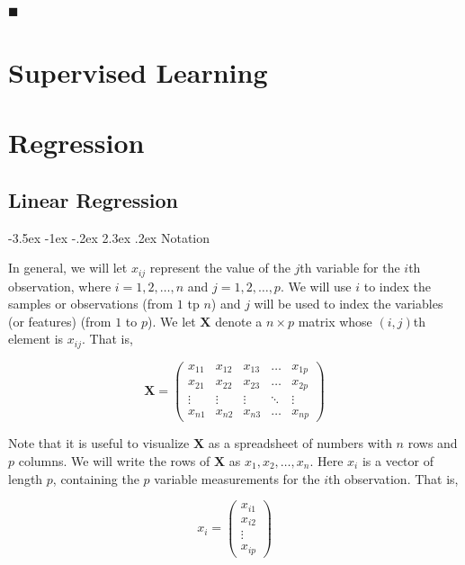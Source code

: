 \documentclass[]{book}
\makeatletter
\renewcommand\section{\@startsection {section}{1}{\z@}%
                                   {-3.5ex \@plus -1ex \@minus -.2ex}%
                                   {2.3ex \@plus.2ex}%
                                   {\normalfont\Large\bfseries\color{ForestGreen}}}
\theoremstyle{definition}
\theoremstyle{definition}
\theoremstyle{definition}
\theoremstyle{remark}
\makeatother
\begin{document}
◼

\part{Supervised Learning}\label{part-supervised-learning}

\part*{Regression}\label{part-regression}

\chapter{Linear Regression}\label{linear-regression}

\section{Notation}\label{notation}

In general, we will let \(x_{ij}\) represent the value of the \(j\)th
variable for the \(i\)th observation, where \(i=1,2,\ldots,n\) and
\(j=1,2,\ldots,p\). We will use \(i\) to index the samples or
observations (from \(1\) tp \(n\)) and \(j\) will be used to index the
variables (or features) (from \(1\) to \(p\)). We let \(\textbf{X}\)
denote a \(n \times p\) matrix whose \((i,j)\)th element is \(x_{ij}\).
That is,

\[ \textbf{X}  = \begin{pmatrix}
    x_{11} & x_{12} & x_{13} & \dots  & x_{1p} \\
    x_{21} & x_{22} & x_{23} & \dots  & x_{2p} \\
    \vdots & \vdots & \vdots & \ddots & \vdots \\
    x_{n1} & x_{n2} & x_{n3} & \dots  & x_{np}
\end{pmatrix} \]

Note that it is useful to visualize \(\textbf{X}\) as a spreadsheet of
numbers with \(n\) rows and \(p\) columns. We will write the rows of
\(\textbf{X}\) as \(x_1 , x_2 , \ldots, x_n\). Here \(x_i\) is a vector
of length \(p\), containing the \(p\) variable measurements for the
\(i\)th observation. That is,

\[ x_i = \begin{pmatrix}
    x_{i1} \\
    x_{i2} \\
    \vdots \\
    x_{ip}
\end{pmatrix}\]
\end{document}
